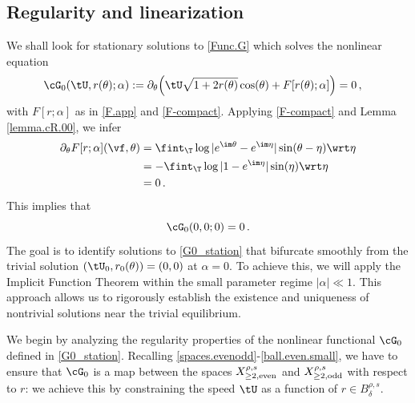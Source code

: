 \documentclass[a4paper,reqno,10pt]{article}
\newcommand{\pa}{\partial}
\begin{document}
\subsection{Regularity and linearization}
 We shall look for stationary  solutions to \eqref{Func.G} which solves the nonlinear equation
\begin{equation}\label{G0_station}
	\begin{aligned}
		\cG_{0}(\tU,r(\theta);\alpha) & := \pa_{\theta}\Big(   \tU  \sqrt{1+2 r(\theta)}\cos(\theta) + F[ r(\theta);\alpha ] \Big) = 0 \,,
	\end{aligned}
\end{equation}
with   $F[ r ;\alpha]$ as in  \eqref{F.app} and \eqref{F-compact}. Applying \eqref{F-compact} and Lemma \ref{lemma.cR.00}, we infer
\begin{align}\label{F1.onehalf}
\nonumber \pa_\theta F[r;\alpha] (\vf,\theta)
		& =    \fint_{\T} \log | e^{\im\theta} -  e^{\im\eta} |  \sin(\theta-\eta)  \wrt \eta\\
        &=- \fint_{\T} \log | 1 -  e^{\im\eta} |  \sin(\eta)  \wrt \eta\\
        &=0 \,.
        \end{align}
This implies that
\begin{equation}\label{G0.onehalf}
	\cG_{0}(0, 0 ; 0)=0 \,.
\end{equation}
%
%
The goal is to identify solutions to \eqref{G0_station} that bifurcate smoothly from the trivial solution $(\tU_{0}, r_0(\theta)) = (0,0)$ at $\alpha = 0$. To achieve this, we will apply the Implicit Function Theorem within the small parameter regime $|\alpha| \ll 1$. This approach allows us to rigorously establish the existence and uniqueness of nontrivial solutions near the trivial equilibrium.

We begin by analyzing the regularity properties of the nonlinear functional $\cG_{0}$ defined in \eqref{G0_station}. Recalling \eqref{spaces.evenodd}-\eqref{ball.even.small}, we have to ensure that $\cG_{0}$ is a map between the spaces $X_{\geq 2,{\rm even}}^{\rho,s}$ and $X_{\geq 2,{\rm odd}}^{\rho,s}$ with respect to $r$: we achieve this by constraining the speed $\tU$ as a function of $r\in B_{\delta}^{\rho,s}$.
\end{document}

